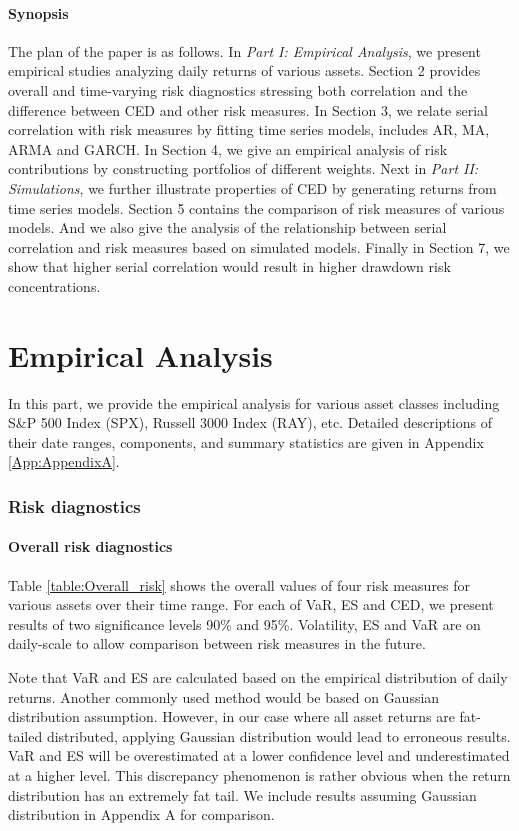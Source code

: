 \documentclass[11pt]{article}
\begin{document}
\subsection{Synopsis}

The plan of the paper is as follows. In \emph{Part I: Empirical Analysis}, we present empirical studies analyzing daily returns of various assets. Section 2 provides overall and time-varying risk diagnostics stressing both correlation and the difference between CED and other risk measures. In Section 3, we relate serial correlation with risk measures by fitting time series models, includes AR, MA, ARMA and GARCH. In Section 4, we give an empirical analysis of risk contributions by constructing portfolios of different weights. Next in \emph{Part II: Simulations}, we further illustrate properties of CED by generating returns from time series models. Section 5 contains the comparison of risk measures of various models. And we also give the analysis of the relationship between serial correlation and risk measures based on simulated models. Finally in Section 7, we show that higher serial correlation would result in higher drawdown risk concentrations.

\part{Empirical Analysis}

In this part, we provide the empirical analysis for various asset classes including S\&P 500 Index (SPX), Russell 3000 Index (RAY), etc. Detailed descriptions of their date ranges, components, and summary statistics are given in Appendix \ref{App:AppendixA}.

\section{Risk diagnostics}

\subsection{Overall risk diagnostics}

Table \ref{table:Overall_risk} shows the overall values of four risk measures for various assets over their time range. For each of VaR, ES and CED, we present results of two significance levels 90\% and 95\%. Volatility, ES and VaR are on daily-scale to allow comparison between risk measures in the future. 

Note that VaR and ES are calculated based on the empirical distribution of daily returns. Another commonly used method would be based on Gaussian distribution assumption. However, in our case where all asset returns are fat-tailed distributed, applying Gaussian distribution would lead to erroneous results. VaR and ES will be overestimated at a lower confidence level and underestimated at a higher level. This discrepancy phenomenon is rather obvious when the return distribution has an extremely fat tail. We include results assuming Gaussian distribution in Appendix A for comparison.
 
\end{document}
